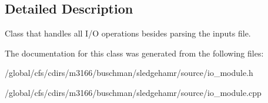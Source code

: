 \subsection{Detailed Description}
Class that handles all I/O operations besides parsing the inputs file. 

The documentation for this class was generated from the following files\+:\begin{DoxyCompactItemize}
\item 
/global/cfs/cdirs/m3166/buschman/sledgehamr/source/io\+\_\+module.\+h\item 
/global/cfs/cdirs/m3166/buschman/sledgehamr/source/io\+\_\+module.\+cpp\end{DoxyCompactItemize}
